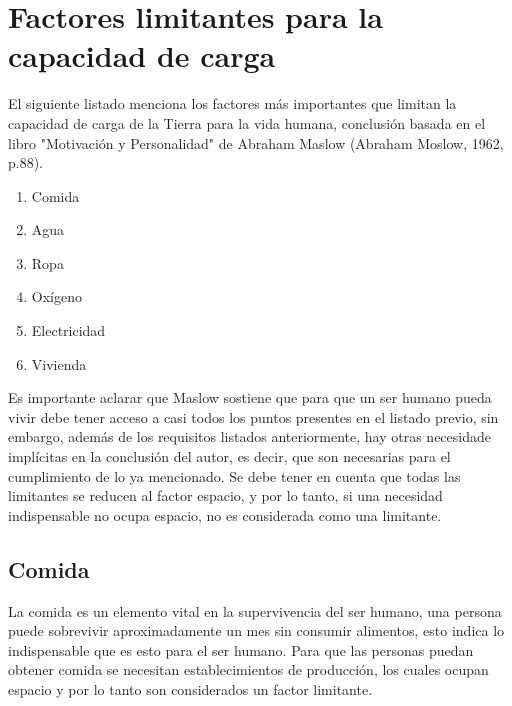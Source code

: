\documentclass[12pt]{report}
\begin{document}
\section*{Factores limitantes para la capacidad de carga}
El siguiente listado menciona los factores m\'as importantes que limitan la capacidad de carga de la Tierra para la vida humana, conclusi\'on basada en el libro "Motivaci\'on y Personalidad" de Abraham Maslow (Abraham Moslow, 1962, p.88). 
\begin{enumerate}
    \item Comida
    \item Agua
    \item Ropa
    \item Ox\'igeno
    \item Electricidad
    \item Vivienda
\end{enumerate}
Es importante aclarar que Maslow sostiene que para que un ser humano pueda vivir debe tener acceso a casi todos los puntos presentes en el listado previo, sin embargo, adem\'as de los requisitos listados anteriormente, hay otras necesidade impl\'icitas en la conclusi\'on del autor, es decir, que son necesarias para el cumplimiento de lo ya mencionado.  Se debe tener en cuenta que todas las limitantes se reducen al factor espacio, y por lo tanto, si una necesidad indispensable no ocupa espacio, no es considerada como una limitante. 

\subsection*{Comida}
La comida es un elemento vital en la supervivencia del ser humano, una persona puede sobrevivir aproximadamente un mes sin consumir alimentos, esto indica lo indispensable que es esto para el ser humano. Para que las personas puedan obtener comida se necesitan establecimientos de producci\'on, los cuales ocupan espacio y por lo tanto son considerados un factor limitante.
\end{document}
